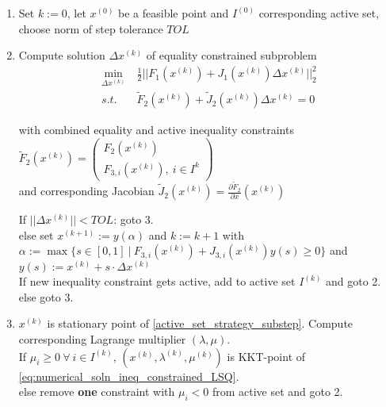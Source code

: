 \documentclass{scrartcl}[12pt, halfparskip]
\numberwithin{equation}{section}
\numberwithin{figure}{section}
\numberwithin{table}{section}
\begin{document}
\begin{enumerate}
	\item Set $k := 0$, let $x^{(0)}$ be a feasible point and $I^{(0)}$ corresponding active set, choose norm of step tolerance $TOL$
	\item Compute solution $\Delta x^{(k)}$ of equality constrained subproblem
	\begin{align}
	\min_{\Delta x^{(k)}} & \ \frac{1}{2} || F_1(x^{(k)}) + J_1(x^{(k)}) \Delta x^{(k)} ||_2^2 \label{active_set_strategy_substep} \\
	s.t. & \ \tilde{F}_2(x^{(k)}) + \tilde{J}_2(x^{(k)}) \Delta x^{(k)} = 0 \nonumber
	\end{align}
	
	with combined equality and active inequality constraints $\tilde{F}_2(x^{(k)}) = 
	\begin{pmatrix} 
	F_2(x^{(k)}) \\  
	F_{3,i}(x^{(k)}), \ i \in I^k
	\end{pmatrix}$ \\
	\textcolor{white}{\quad} and corresponding Jacobian $\tilde{J}_2(x^{(k)}) = \frac{\partial \tilde{F}_2}{\partial x}(x^{(k)})$
	
	If $||\Delta x^{(k)}|| < TOL$: goto 3. \\
	\textcolor{white}{\quad}else set $x^{(k+1)} := y(\alpha)$ and $k := k+1$ with \\
	\textcolor{white}{\qquad}$\alpha := \max\{ s \in [0,1] \ | \ F_{3,i}(x^{(k)}) + J_{3,i}(x^{(k)}) y(s) \ge 0 \}$ and \\
	\textcolor{white}{\qquad}$y(s) := x^{(k)} + s \cdot \Delta x^{(k)}$ \\
	
	If new inequality constraint gets active, add to active set $I^{(k)}$ and goto 2. \\
	\textcolor{white}{\quad}else goto 3.
	
	\item $x^{(k)}$ is stationary point of \cref{active_set_strategy_substep}. Compute corresponding Lagrange multiplier $(\lambda, \mu)$. \\
	If $\mu_i \ge 0 \ \forall \ i \in I^{(k)}$, $(x^{(k)},\lambda^{(k)},\mu^{(k)})$ is KKT-point of \cref{eq:numerical_soln_ineq_constrained_LSQ}. \\
	\textcolor{white}{\quad}else remove \textbf{one} constraint with $\mu_i < 0$ from active set and goto 2.
	
\end{enumerate}
\end{document}
